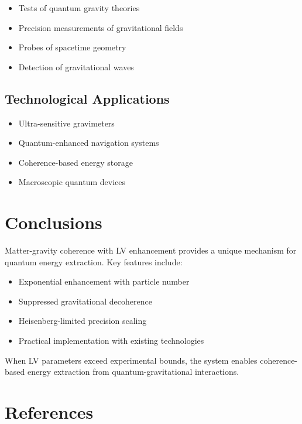 \documentclass[11pt]{article}
\begin{document}
\begin{itemize}
\item Tests of quantum gravity theories
\item Precision measurements of gravitational fields
\item Probes of spacetime geometry
\item Detection of gravitational waves
\end{itemize}

\subsection{Technological Applications}

\begin{itemize}
\item Ultra-sensitive gravimeters
\item Quantum-enhanced navigation systems
\item Coherence-based energy storage
\item Macroscopic quantum devices
\end{itemize}

\section{Conclusions}

Matter-gravity coherence with LV enhancement provides a unique mechanism for quantum energy extraction. Key features include:

\begin{itemize}
\item Exponential enhancement with particle number
\item Suppressed gravitational decoherence
\item Heisenberg-limited precision scaling
\item Practical implementation with existing technologies
\end{itemize}

When LV parameters exceed experimental bounds, the system enables coherence-based energy extraction from quantum-gravitational interactions.

\section*{References}
\end{document}
